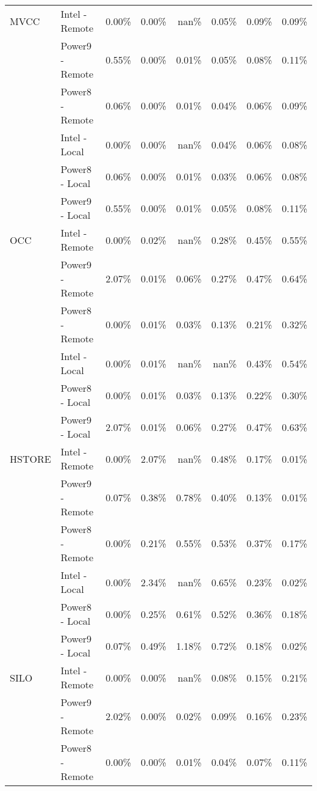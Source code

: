 \begin{tabular}{llrrrrrr}
MVCC & Intel - Remote &  0.00\% &  0.00\% &   nan\% &  0.05\% &  0.09\% &  0.09\% \\
       & Power9 - Remote &  0.55\% &  0.00\% &  0.01\% &  0.05\% &  0.08\% &  0.11\% \\
       & Power8 - Remote &  0.06\% &  0.00\% &  0.01\% &  0.04\% &  0.06\% &  0.09\% \\
       & Intel - Local &  0.00\% &  0.00\% &   nan\% &  0.04\% &  0.06\% &  0.08\% \\
       & Power8 - Local &  0.06\% &  0.00\% &  0.01\% &  0.03\% &  0.06\% &  0.08\% \\
       & Power9 - Local &  0.55\% &  0.00\% &  0.01\% &  0.05\% &  0.08\% &  0.11\% \\
OCC & Intel - Remote &  0.00\% &  0.02\% &   nan\% &  0.28\% &  0.45\% &  0.55\% \\
       & Power9 - Remote &  2.07\% &  0.01\% &  0.06\% &  0.27\% &  0.47\% &  0.64\% \\
       & Power8 - Remote &  0.00\% &  0.01\% &  0.03\% &  0.13\% &  0.21\% &  0.32\% \\
       & Intel - Local &  0.00\% &  0.01\% &   nan\% &   nan\% &  0.43\% &  0.54\% \\
       & Power8 - Local &  0.00\% &  0.01\% &  0.03\% &  0.13\% &  0.22\% &  0.30\% \\
       & Power9 - Local &  2.07\% &  0.01\% &  0.06\% &  0.27\% &  0.47\% &  0.63\% \\
HSTORE & Intel - Remote &  0.00\% &  2.07\% &   nan\% &  0.48\% &  0.17\% &  0.01\% \\
       & Power9 - Remote &  0.07\% &  0.38\% &  0.78\% &  0.40\% &  0.13\% &  0.01\% \\
       & Power8 - Remote &  0.00\% &  0.21\% &  0.55\% &  0.53\% &  0.37\% &  0.17\% \\
       & Intel - Local &  0.00\% &  2.34\% &   nan\% &  0.65\% &  0.23\% &  0.02\% \\
       & Power8 - Local &  0.00\% &  0.25\% &  0.61\% &  0.52\% &  0.36\% &  0.18\% \\
       & Power9 - Local &  0.07\% &  0.49\% &  1.18\% &  0.72\% &  0.18\% &  0.02\% \\
SILO & Intel - Remote &  0.00\% &  0.00\% &   nan\% &  0.08\% &  0.15\% &  0.21\% \\
       & Power9 - Remote &  2.02\% &  0.00\% &  0.02\% &  0.09\% &  0.16\% &  0.23\% \\
       & Power8 - Remote &  0.00\% &  0.00\% &  0.01\% &  0.04\% &  0.07\% &  0.11\% \\

\end{tabular}
